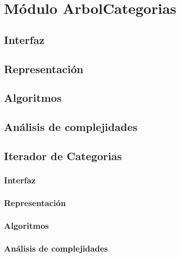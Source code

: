 \documentclass[12pt, a4paper]{article}
\begin{document}
% 
% 
% 
% 
\newpage

\section{Módulo ArbolCategorias} 
\subsection{Interfaz}

\subsection{Representaci\'on}

\subsection{Algoritmos}

\subsection{Análisis de complejidades}

\newpage

\subsection{Iterador de Categorias} 
\subsubsection{Interfaz}

\subsubsection{Representaci\'on}

\subsubsection{Algoritmos}

\subsubsection{Análisis de complejidades}

\newpage
\end{document}
